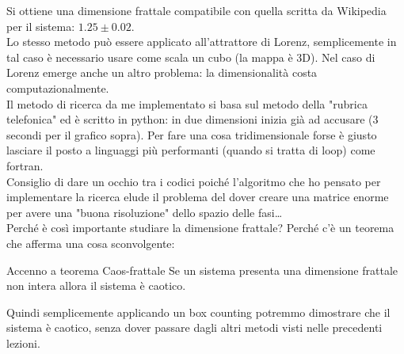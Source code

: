 \noindent
Si ottiene una dimensione frattale compatibile con quella scritta da Wikipedia per il sistema: $1.25 \pm 0.02$.\\
Lo stesso metodo può essere applicato all'attrattore di Lorenz, semplicemente in tal caso è necessario usare come scala un cubo (la mappa è 3D).
Nel caso di Lorenz emerge anche un altro problema: la dimensionalità costa computazionalmente. \\
Il metodo di ricerca da me implementato si basa sul metodo della "rubrica telefonica" ed è scritto in python: in due dimensioni inizia già ad accusare (3 secondi per il grafico sopra). Per fare una cosa tridimensionale forse è giusto lasciare il posto a linguaggi più performanti (quando si tratta di loop) come fortran.\\
Consiglio di dare un occhio tra i codici poiché l'algoritmo che ho pensato per implementare la ricerca elude il problema del dover creare una matrice enorme per avere una "buona risoluzione" dello spazio delle fasi\ldots\\
Perché è così importante studiare la dimensione frattale? Perché c'è un teorema che afferma una cosa sconvolgente:
\begin{redbox}{Accenno a teorema Caos-frattale}
    Se un sistema presenta una dimensione frattale non intera allora il sistema è caotico.
\end{redbox}
\noindent
Quindi semplicemente applicando un box counting potremmo dimostrare che il sistema è caotico, senza dover passare dagli altri metodi visti nelle precedenti lezioni.\\
